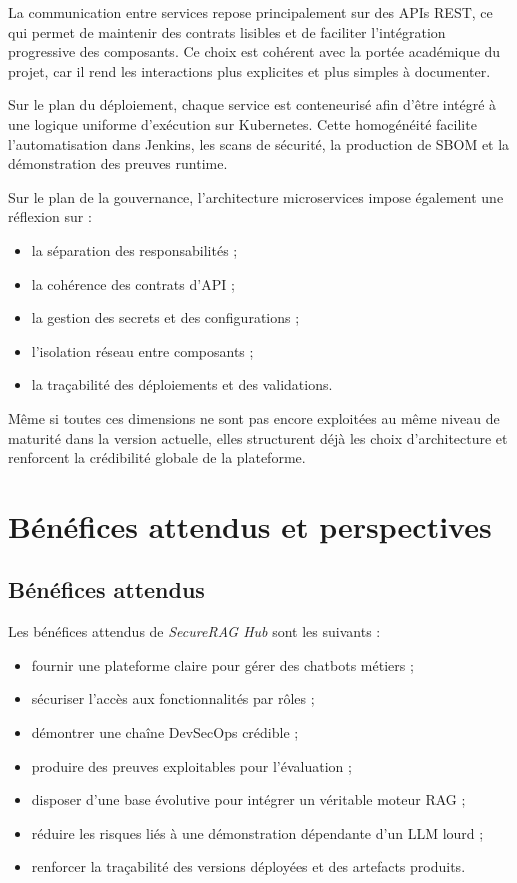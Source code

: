 La communication entre services repose principalement sur des APIs REST, ce qui permet de maintenir des contrats lisibles et de faciliter l’intégration progressive des composants. Ce choix est cohérent avec la portée académique du projet, car il rend les interactions plus explicites et plus simples à documenter.

Sur le plan du déploiement, chaque service est conteneurisé afin d’être intégré à une logique uniforme d’exécution sur Kubernetes. Cette homogénéité facilite l’automatisation dans Jenkins, les scans de sécurité, la production de SBOM et la démonstration des preuves runtime.

Sur le plan de la gouvernance, l’architecture microservices impose également une réflexion sur :

\begin{itemize}
    \item la séparation des responsabilités ;
    \item la cohérence des contrats d’API ;
    \item la gestion des secrets et des configurations ;
    \item l’isolation réseau entre composants ;
    \item la traçabilité des déploiements et des validations.
\end{itemize}

Même si toutes ces dimensions ne sont pas encore exploitées au même niveau de maturité dans la version actuelle, elles structurent déjà les choix d’architecture et renforcent la crédibilité globale de la plateforme.

\section{Bénéfices attendus et perspectives}

\subsection{Bénéfices attendus}

Les bénéfices attendus de \textit{SecureRAG Hub} sont les suivants :

\begin{itemize}
    \item fournir une plateforme claire pour gérer des chatbots métiers ;
    \item sécuriser l’accès aux fonctionnalités par rôles ;
    \item démontrer une chaîne DevSecOps crédible ;
    \item produire des preuves exploitables pour l’évaluation ;
    \item disposer d’une base évolutive pour intégrer un véritable moteur RAG ;
    \item réduire les risques liés à une démonstration dépendante d’un LLM lourd ;
    \item renforcer la traçabilité des versions déployées et des artefacts produits.
\end{itemize}


